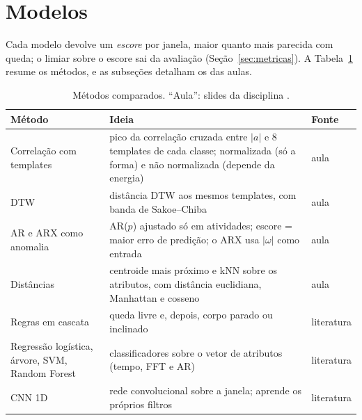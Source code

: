 \documentclass[12pt,a4paper]{article}
\newcommand{\amag}{|a|}
\newcommand{\wmag}{|\omega|}
\begin{document}
\section{Modelos}\label{sec:modelos}
Cada modelo devolve um \emph{escore} por janela, maior quanto mais parecida com queda;
o limiar sobre o escore sai da avaliação (Seção~\ref{sec:metricas}). A
Tabela~\ref{tab:metodos} resume os métodos, e as subseções detalham os das aulas.

\begin{table}[H]
\centering
\caption{Métodos comparados. ``Aula'': slides da disciplina \cite{slides}.}
\label{tab:metodos}
\small
\begin{tabular}{@{}>{\raggedright\arraybackslash}p{3.6cm}>{\raggedright\arraybackslash}p{9.0cm}l@{}}
\toprule
Método & Ideia & Fonte \\
\midrule
Correlação com templates & pico da correlação cruzada entre $\amag$ e 8 templates de cada classe; normalizada (só a forma) e não normalizada (depende da energia) & aula \\
DTW & distância DTW aos mesmos templates, com banda de Sakoe--Chiba & aula \\
AR e ARX como anomalia & AR($p$) ajustado só em atividades; escore = maior erro de predição; o ARX usa $\wmag$ como entrada & aula \\
Distâncias & centroide mais próximo e kNN sobre os atributos, com distância euclidiana, Manhattan e cosseno & aula \\
Regras em cascata & queda livre e, depois, corpo parado ou inclinado & literatura \\
Regressão logística, árvore, SVM, Random Forest & classificadores sobre o vetor de atributos (tempo, FFT e AR) & literatura \\
CNN 1D & rede convolucional sobre a janela; aprende os próprios filtros & literatura \\
\bottomrule
\end{tabular}
\end{table}
\end{document}
